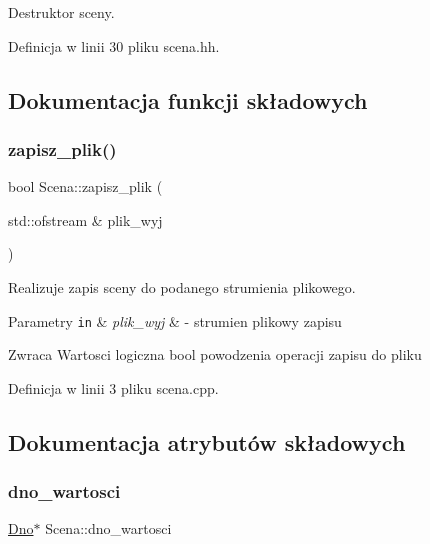 Destruktor sceny. 



Definicja w linii 30 pliku scena.\+hh.



\subsection{Dokumentacja funkcji składowych}
\mbox{\label{class_scena_a76bbf6eceb1bade5fd2acbdd41fa229f}} 
\subsubsection{\texorpdfstring{zapisz\+\_\+plik()}{zapisz\_plik()}}
{\footnotesize\ttfamily bool Scena\+::zapisz\+\_\+plik (\begin{DoxyParamCaption}\item[{std\+::ofstream \&}]{plik\+\_\+wyj }\end{DoxyParamCaption})}



Realizuje zapis sceny do podanego strumienia plikowego. 


\begin{DoxyParams}[1]{Parametry}
\mbox{\tt in}  & {\em plik\+\_\+wyj} & -\/ strumien plikowy zapisu \\
\hline
\end{DoxyParams}
\begin{DoxyReturn}{Zwraca}
Wartosci logiczna bool powodzenia operacji zapisu do pliku 
\end{DoxyReturn}


Definicja w linii 3 pliku scena.\+cpp.



\subsection{Dokumentacja atrybutów składowych}
\mbox{\label{class_scena_aa4deb37aaebf4a31512a4b12b8416fbb}} 
\subsubsection{\texorpdfstring{dno\+\_\+wartosci}{dno\_wartosci}}
{\footnotesize\ttfamily \hyperlink{class_dno}{Dno}$\ast$ Scena\+::dno\+\_\+wartosci\hspace{0.3cm}{\ttfamily [private]}}



